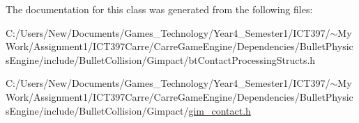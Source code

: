 The documentation for this class was generated from the following files:\begin{CompactItemize}
\item 
C:/Users/New/Documents/Games\_\-Technology/Year4\_\-Semester1/ICT397/$\sim$My Work/Assignment1/ICT397Carre/CarreGameEngine/Dependencies/BulletPhysicsEngine/include/BulletCollision/Gimpact/btContactProcessingStructs.h\item 
C:/Users/New/Documents/Games\_\-Technology/Year4\_\-Semester1/ICT397/$\sim$My Work/Assignment1/ICT397Carre/CarreGameEngine/Dependencies/BulletPhysicsEngine/include/BulletCollision/Gimpact/\hyperlink{gim__contact_8h}{gim\_\-contact.h}\end{CompactItemize}
